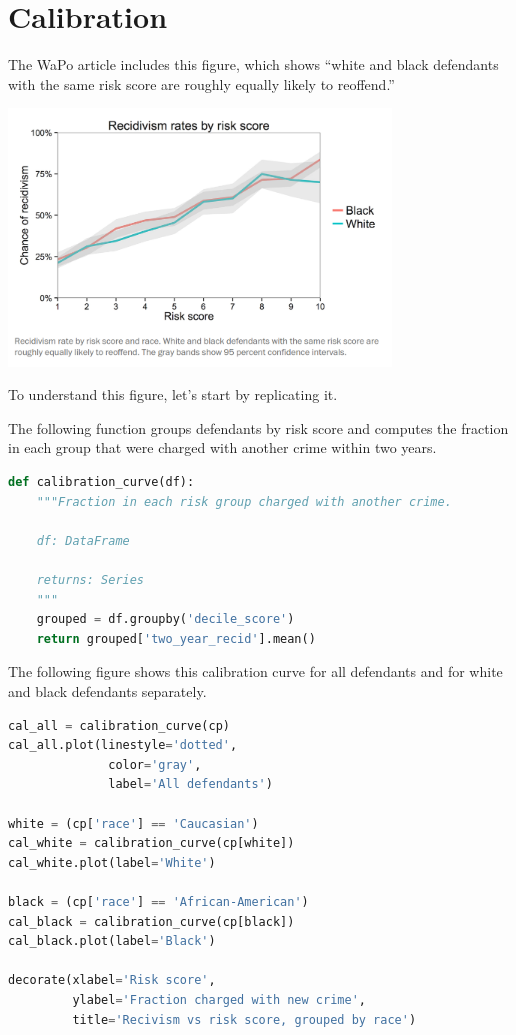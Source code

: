 \hypertarget{calibration-1}{%
\section{Calibration}\label{calibration-1}}

The WaPo article includes this figure, which shows ``white and black
defendants with the same risk score are roughly equally likely to
reoffend.''

\includegraphics[width=4in]{figs/calibration1.png}

To understand this figure, let's start by replicating it.

The following function groups defendants by risk score and computes the
fraction in each group that were charged with another crime within two
years.

\begin{lstlisting}[language=Python,style=source]
def calibration_curve(df):
    """Fraction in each risk group charged with another crime.
    
    df: DataFrame
    
    returns: Series
    """
    grouped = df.groupby('decile_score')
    return grouped['two_year_recid'].mean()
\end{lstlisting}

The following figure shows this calibration curve for all defendants and
for white and black defendants separately.

\begin{lstlisting}[language=Python,style=source]
cal_all = calibration_curve(cp)
cal_all.plot(linestyle='dotted', 
              color='gray',
              label='All defendants')

white = (cp['race'] == 'Caucasian')
cal_white = calibration_curve(cp[white])
cal_white.plot(label='White')

black = (cp['race'] == 'African-American')
cal_black = calibration_curve(cp[black])
cal_black.plot(label='Black')

decorate(xlabel='Risk score',
         ylabel='Fraction charged with new crime',
         title='Recivism vs risk score, grouped by race')
\end{lstlisting}

